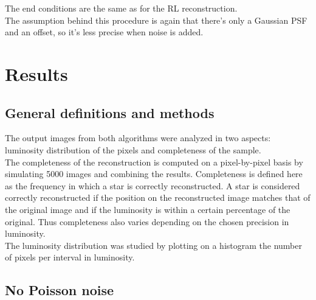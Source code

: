\documentclass[a4paper]{article}
\begin{document}
\begin{multicols}{2}
			The end conditions are the same as for the RL reconstruction.\\
			
			The assumption behind this procedure is again that there's only a Gaussian PSF and an offset, so it's less precise when noise is added.
		
	
	\end{multicols}

	\vspace{0.035\textheight}

	\section{Results}
	\begin{multicols}{2}
		\subsection{General definitions and methods}
			The output images from both algorithms were analyzed in two aspects: luminosity distribution of the pixels and completeness of the sample.\\
			
			The completeness of the reconstruction is computed on a pixel-by-pixel basis by simulating 5000 images and combining the results. Completeness is defined here as the frequency in which a star is correctly reconstructed. A star is considered correctly reconstructed if the position on the reconstructed image matches that of the original image and if the luminosity is within a certain percentage of the original. Thus completeness also varies depending on the chosen precision in luminosity.\\
			
			The luminosity distribution was studied by plotting on a histogram the number of pixels per interval in luminosity.\\
		
	\end{multicols}
		\subsection{No Poisson noise}
		
\end{document}
